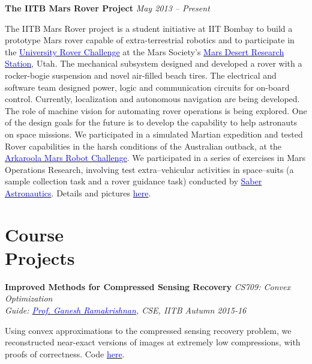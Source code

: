 \documentclass[margin,line]{res}
\newenvironment{list1}{
  \begin{list}{\ding{113}}{%
      \setlength{\itemsep}{0in}
      \setlength{\parsep}{0in} \setlength{\parskip}{0in}
      \setlength{\topsep}{0in} \setlength{\partopsep}{0in} 
      \setlength{\leftmargin}{0.17in}}}{\end{list}}
\begin{document}
\begin{resume}
{\bf The IITB Mars Rover Project}
\hfill {\it May 2013 -- Present} \\
\vspace*{-.13in}
\begin{list1}
\item[]
The IITB Mars Rover project is a student initiative at IIT Bombay to build a prototype Mars rover capable of extra-terrestrial robotics and to participate in the \href{http://urc.marssociety.org/}{\textcolor{blue} {University Rover Challenge}} at the Mars Society's \href{http://mdrs.marssociety.org/}{\textcolor{blue} {Mars Desert Research Station}}, Utah. The mechanical subsystem designed and developed a rover with a rocker-bogie suspension and novel air-filled beach tires. The electrical and software team designed power, logic and communication circuits for on-board control. Currently, localization and autonomous navigation are being developed. The role of machine vision for automating rover operations is being explored. One of the design goals for the future is to develop the capability to help astronauts on space missions. We participated in a simulated Martian expedition and tested Rover capabilities in the harsh conditions of the Australian outback, at the \href{http://marssociety.org.au/article/arkaroola-mars-robot-challenge-spaceward-bound-expedition}{\textcolor{blue} {Arkaroola Mars Robot Challenge}}. We participated in a series of exercises in Mars Operations Research, involving test extra--vehicular activities in space--suits (a sample collection task and a rover guidance task) conducted by \href{https://saberastro.com/}{\textcolor{blue} {Saber Astronautics}}. Details and pictures \href{http://alankarkotwal.github.io/#projects}{\textcolor{blue} {here}}.
\end{list1}

\section{\sc Course \\Projects}
{\bf Improved Methods for Compressed Sensing Recovery} \hfill {\it CS709: Convex Optimization} \\
{\em Guide: \href{https://www.cse.iitb.ac.in/~ganesh/}{\textcolor{blue}{Prof. Ganesh Ramakrishnan}}, CSE, IITB \hfill Autumn 2015-16} \\
\vspace*{-.15in}
\begin{list1}
\item[] Using convex approximations to the compressed sensing recovery problem, we reconstructed near-exact versions of images at extremely low compressions, with proofs of correctness. Code \href{https://github.com/alankarkotwal/cs-rank-minimization}{\textcolor{blue} {here}}.
\end{list1}


\end{resume}
\end{document}
